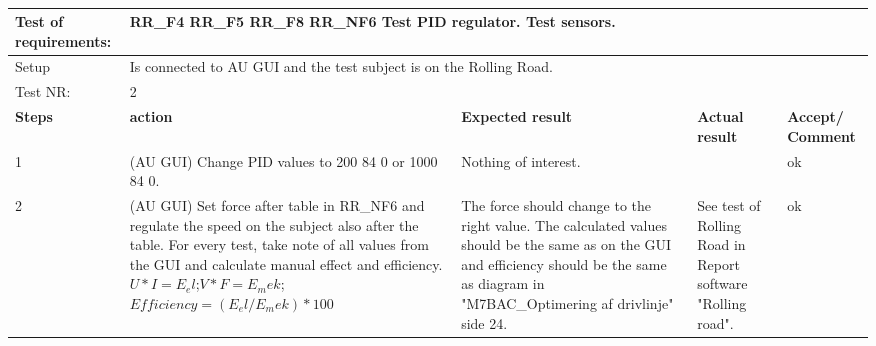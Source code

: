 \begin{table}[h!]
	\centering
	\label{my-label}	
	\begin{tabular}{|p{1.5 cm}|p{4.2 cm}|p{2.1 cm}|p{2.1 cm}|p{2.1 cm}|}
		\hline
		Test of requirements: 
		& \multicolumn{4}{l|}{RR\_F4 RR\_F5 RR\_F8 RR\_NF6 Test PID regulator. Test sensors.} \\ \hline
		Setup 
		& \multicolumn{4}{l|}{Is connected to AU GUI and the test subject is on the Rolling Road.} \\ \hline
		Test NR:
		& \multicolumn{4}{l|}{2} \\ \hline
		\textbf{Steps} & \textbf{action} & \textbf{Expected result} & 
		\textbf{Actual result} & \textbf{Accept/ Comment} \\ \hline
		1 
		& (AU GUI) Change PID values to 200 84 0 or 1000 84 0. 
		& Nothing of interest.
		& 
		& ok\\ \hline
		2
		& (AU GUI) Set force after table in RR\_NF6 and regulate the speed on the subject also after the table. For every test, take note of all values from the GUI and calculate manual effect and efficiency. $ U*I=E_el $;$ V*F=E_mek $; $ Efficiency=(E_el/E_mek)*100 $
		& The force should change to the right value. The calculated values should be the same as on the GUI and efficiency should be the same as diagram in  "M7BAC\_Optimering af drivlinje" side 24. 
		& See test of Rolling Road in Report software "Rolling road".
		& ok \\ \hline
	\end{tabular}
	\caption{}
\end{table}

